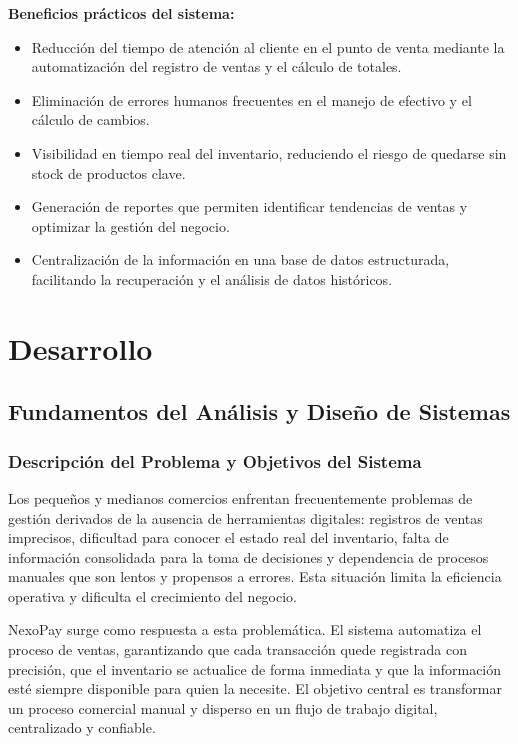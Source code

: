 \documentclass[12pt,a4paper]{report}
\begin{document}
\textbf{Beneficios prácticos del sistema:}
\begin{itemize}
    \item Reducción del tiempo de atención al cliente en el punto de venta mediante la automatización del registro de ventas y el cálculo de totales.
    \item Eliminación de errores humanos frecuentes en el manejo de efectivo y el cálculo de cambios.
    \item Visibilidad en tiempo real del inventario, reduciendo el riesgo de quedarse sin stock de productos clave.
    \item Generación de reportes que permiten identificar tendencias de ventas y optimizar la gestión del negocio.
    \item Centralización de la información en una base de datos estructurada, facilitando la recuperación y el análisis de datos históricos.
\end{itemize}

\chapter{Desarrollo}

\section{Fundamentos del Análisis y Diseño de Sistemas}

\subsection{Descripción del Problema y Objetivos del Sistema}

Los pequeños y medianos comercios enfrentan frecuentemente problemas de gestión derivados de la ausencia de herramientas digitales: registros de ventas imprecisos, dificultad para conocer el estado real del inventario, falta de información consolidada para la toma de decisiones y dependencia de procesos manuales que son lentos y propensos a errores. Esta situación limita la eficiencia operativa y dificulta el crecimiento del negocio.

NexoPay surge como respuesta a esta problemática. El sistema automatiza el proceso de ventas, garantizando que cada transacción quede registrada con precisión, que el inventario se actualice de forma inmediata y que la información esté siempre disponible para quien la necesite. El objetivo central es transformar un proceso comercial manual y disperso en un flujo de trabajo digital, centralizado y confiable.
\end{document}
